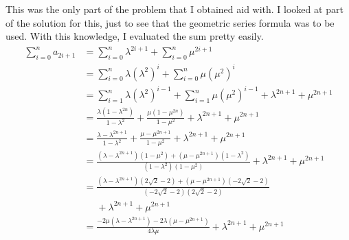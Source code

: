 \documentclass[a4paper]{article}
\begin{document}
This was the only part of the problem that I obtained aid with.
I looked at part of the solution for this, just to see that the geometric series formula was to be used.
With this knowledge, I evaluated the sum pretty easily.
\begin{align*}
    \sum_{i=0}^{n} a_{2i+1} & = \sum_{i=0}^{n} \lambda^{2i+1} + \sum_{i=0}^{n} \mu^{2i+1}                                                                                                                                        \\
                            & = \sum_{i=0}^{n} \lambda\left(\lambda^2\right)^i + \sum_{i=0}^{n} \mu\left(\mu^2\right)^i                                                                                                          \\
                            & = \sum_{i=1}^{n} \lambda\left(\lambda^2\right)^{i-1} + \sum_{i=1}^{n} \mu\left(\mu^2\right)^{i-1} + \lambda^{2n+1} + \mu^{2n+1}                                                                    \\
                            & = \frac{\lambda\left(1-\lambda^{2n}\right)}{1-\lambda^2} + \frac{\mu\left(1-\mu^{2n}\right)}{1-\mu^2} + \lambda^{2n+1} + \mu^{2n+1}                                                                \\
                            & = \frac{\lambda-\lambda^{2n+1}}{1-\lambda^2} + \frac{\mu-\mu^{2n+1}}{1-\mu^2} + \lambda^{2n+1} + \mu^{2n+1}                                                                                        \\
                            & = \frac{\left(\lambda-\lambda^{2n+1}\right)\left(1-\mu^2\right) + \left(\mu-\mu^{2n+1}\right)\left(1-\lambda^2\right)}{\left(1-\lambda^2\right)\left(1-\mu^2\right)} + \lambda^{2n+1} + \mu^{2n+1} \\
                            & = \frac{\left(\lambda-\lambda^{2n+1}\right)\left(2\sqrt{2}-2\right) + \left(\mu-\mu^{2n+1}\right)\left(-2\sqrt{2}-2\right)}{\left(-2\sqrt{2}-2\right)\left(2\sqrt{2}-2\right)}                     \\
                            & \phantom{=}+ \lambda^{2n+1} + \mu^{2n+1}                                                                                                                                                           \\
                            & = \frac{-2\mu\left(\lambda-\lambda^{2n+1}\right) - 2\lambda\left(\mu-\mu^{2n+1}\right)}{4\lambda\mu} + \lambda^{2n+1} + \mu^{2n+1}                                                                 \\

\end{align*}
\end{document}
